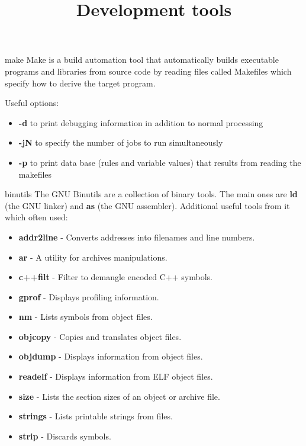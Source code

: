 

\title{Development tools}


\frame{\titlepage}

\begin{frame}{make}
\justifying Make is a build automation tool that automatically builds executable programs and 
libraries from source code by reading files called Makefiles which specify how to 
derive the target program. \newline

Useful options:
    \begin{itemize}
        \item \textbf{-d} to print debugging information in addition to normal processing
        \item \textbf{-jN} to specify the number of jobs to run simultaneously
        \item \textbf{-p} to print data base (rules and variable values) that results from reading the makefiles
    \end{itemize}
\end{frame}
\begin{frame}{binutils}
The GNU Binutils are a collection of binary tools. The main ones are \textbf{ld} (the GNU linker) and \textbf{as} (the GNU assembler).
Additional useful tools from it which often used:

    \begin{itemize}
        \item \textbf{addr2line} - Converts addresses into filenames and line numbers.
        \item \textbf{ar} - A utility for archives manipulations.
        \item \textbf{c++filt} - Filter to demangle encoded C++ symbols.
        \item \textbf{gprof} - Displays profiling information.
        \item \textbf{nm} - Lists symbols from object files.
        \item \textbf{objcopy} - Copies and translates object files.
        \item \textbf{objdump} - Displays information from object files.
        \item \textbf{readelf} - Displays information from ELF object files.
        \item \textbf{size} - Lists the section sizes of an object or archive file.
        \item \textbf{strings} - Lists printable strings from files.
        \item \textbf{strip} - Discards symbols.
    \end{itemize}
\end{frame}
